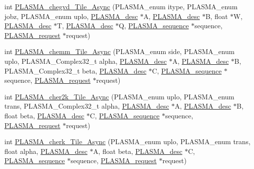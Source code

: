 \begin{DoxyCompactItemize}
\item 
int \hyperlink{group__PLASMA__Complex32__t__Tile__Async_gae780d060a37f6113c5cdbe6aa9f9fc1a_gae780d060a37f6113c5cdbe6aa9f9fc1a}{P\+L\+A\+S\+M\+A\+\_\+chegvd\+\_\+\+Tile\+\_\+\+Async} (P\+L\+A\+S\+M\+A\+\_\+enum itype, P\+L\+A\+S\+M\+A\+\_\+enum jobz, P\+L\+A\+S\+M\+A\+\_\+enum uplo, \hyperlink{structplasma__desc__t}{P\+L\+A\+S\+M\+A\+\_\+desc} $\ast$A, \hyperlink{structplasma__desc__t}{P\+L\+A\+S\+M\+A\+\_\+desc} $\ast$B, float $\ast$W, \hyperlink{structplasma__desc__t}{P\+L\+A\+S\+M\+A\+\_\+desc} $\ast$T, \hyperlink{structplasma__desc__t}{P\+L\+A\+S\+M\+A\+\_\+desc} $\ast$Q, \hyperlink{structplasma__sequence__t}{P\+L\+A\+S\+M\+A\+\_\+sequence} $\ast$sequence, \hyperlink{structplasma__request__t}{P\+L\+A\+S\+M\+A\+\_\+request} $\ast$request)
\item 
int \hyperlink{group__PLASMA__Complex32__t__Tile__Async_ga8ce32174fda2ab08e5616a5ca3723532_ga8ce32174fda2ab08e5616a5ca3723532}{P\+L\+A\+S\+M\+A\+\_\+chemm\+\_\+\+Tile\+\_\+\+Async} (P\+L\+A\+S\+M\+A\+\_\+enum side, P\+L\+A\+S\+M\+A\+\_\+enum uplo, P\+L\+A\+S\+M\+A\+\_\+\+Complex32\+\_\+t alpha, \hyperlink{structplasma__desc__t}{P\+L\+A\+S\+M\+A\+\_\+desc} $\ast$A, \hyperlink{structplasma__desc__t}{P\+L\+A\+S\+M\+A\+\_\+desc} $\ast$B, P\+L\+A\+S\+M\+A\+\_\+\+Complex32\+\_\+t beta, \hyperlink{structplasma__desc__t}{P\+L\+A\+S\+M\+A\+\_\+desc} $\ast$C, \hyperlink{structplasma__sequence__t}{P\+L\+A\+S\+M\+A\+\_\+sequence} $\ast$sequence, \hyperlink{structplasma__request__t}{P\+L\+A\+S\+M\+A\+\_\+request} $\ast$request)
\item 
int \hyperlink{group__PLASMA__Complex32__t__Tile__Async_ga3eb0477b6634d1654410747893dcd111_ga3eb0477b6634d1654410747893dcd111}{P\+L\+A\+S\+M\+A\+\_\+cher2k\+\_\+\+Tile\+\_\+\+Async} (P\+L\+A\+S\+M\+A\+\_\+enum uplo, P\+L\+A\+S\+M\+A\+\_\+enum trans, P\+L\+A\+S\+M\+A\+\_\+\+Complex32\+\_\+t alpha, \hyperlink{structplasma__desc__t}{P\+L\+A\+S\+M\+A\+\_\+desc} $\ast$A, \hyperlink{structplasma__desc__t}{P\+L\+A\+S\+M\+A\+\_\+desc} $\ast$B, float beta, \hyperlink{structplasma__desc__t}{P\+L\+A\+S\+M\+A\+\_\+desc} $\ast$C, \hyperlink{structplasma__sequence__t}{P\+L\+A\+S\+M\+A\+\_\+sequence} $\ast$sequence, \hyperlink{structplasma__request__t}{P\+L\+A\+S\+M\+A\+\_\+request} $\ast$request)
\item 
int \hyperlink{group__PLASMA__Complex32__t__Tile__Async_ga64ea0a6e1f687b34b7c1cbc2cc0e6c74_ga64ea0a6e1f687b34b7c1cbc2cc0e6c74}{P\+L\+A\+S\+M\+A\+\_\+cherk\+\_\+\+Tile\+\_\+\+Async} (P\+L\+A\+S\+M\+A\+\_\+enum uplo, P\+L\+A\+S\+M\+A\+\_\+enum trans, float alpha, \hyperlink{structplasma__desc__t}{P\+L\+A\+S\+M\+A\+\_\+desc} $\ast$A, float beta, \hyperlink{structplasma__desc__t}{P\+L\+A\+S\+M\+A\+\_\+desc} $\ast$C, \hyperlink{structplasma__sequence__t}{P\+L\+A\+S\+M\+A\+\_\+sequence} $\ast$sequence, \hyperlink{structplasma__request__t}{P\+L\+A\+S\+M\+A\+\_\+request} $\ast$request)

\end{DoxyCompactItemize}
